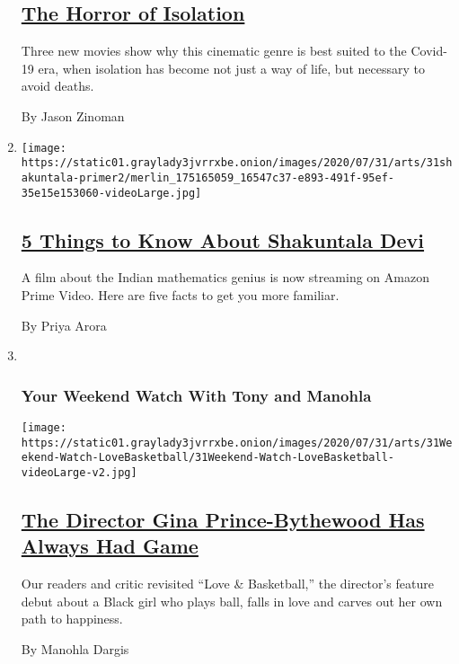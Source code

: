 \begin{enumerate}
  \hypertarget{the-horror-of-isolation}{%
  \subsection{\texorpdfstring{\href{/2020/07/29/movies/horror-she-dies-tomorrow-relic-amulet.html}{The
  Horror of
  Isolation}}{The Horror of Isolation}}\label{the-horror-of-isolation}}

  Three new movies show why this cinematic genre is best suited to the
  Covid-19 era, when isolation has become not just a way of life, but
  necessary to avoid deaths.

  By Jason Zinoman
\item
  \texttt{[image: https://static01.graylady3jvrrxbe.onion/images/2020/07/31/arts/31shakuntala-primer2/merlin\_175165059\_16547c37-e893-491f-95ef-35e15e153060-videoLarge.jpg]}

  \hypertarget{5-things-to-know-about-shakuntala-devi}{%
  \subsection{\texorpdfstring{\href{/2020/07/31/movies/shakuntala-devi-movie.html}{5
  Things to Know About Shakuntala
  Devi}}{5 Things to Know About Shakuntala Devi}}\label{5-things-to-know-about-shakuntala-devi}}

  A film about the Indian mathematics genius is now streaming on Amazon
  Prime Video. Here are five facts to get you more familiar.

  By Priya Arora
\item ~
  \hypertarget{your-weekend-watch-with-tony-and-manohla}{%
  \subsubsection{Your Weekend Watch With Tony and
  Manohla}\label{your-weekend-watch-with-tony-and-manohla}}

  \texttt{[image: https://static01.graylady3jvrrxbe.onion/images/2020/07/31/arts/31Weekend-Watch-LoveBasketball/31Weekend-Watch-LoveBasketball-videoLarge-v2.jpg]}

  \hypertarget{the-director-gina-prince-bythewood-has-always-had-game}{%
  \subsection{\texorpdfstring{\href{/2020/07/28/movies/love-basketball-viewing-party.html}{The
  Director Gina Prince-Bythewood Has Always Had
  Game}}{The Director Gina Prince-Bythewood Has Always Had Game}}\label{the-director-gina-prince-bythewood-has-always-had-game}}

  Our readers and critic revisited ``Love \& Basketball,'' the
  director's feature debut about a Black girl who plays ball, falls in
  love and carves out her own path to happiness.

  By Manohla Dargis
\end{enumerate}

